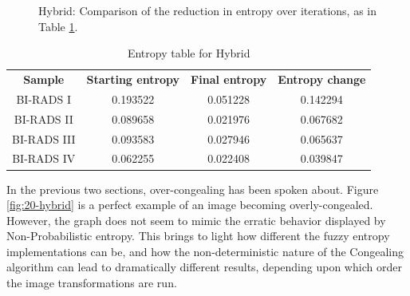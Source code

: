 \begin{figure}[H]
  \begin{center}
    \caption{Hybrid: Comparison of the reduction in entropy over iterations, as in Table \ref{table:hybrid-entropy}.}
  \end{center}
\end{figure}

\begin{table}[H]
  \centering
  \begin{tabular}{| c | c | c  | c |}
    \textbf{Sample} & \textbf{Starting entropy} & \textbf{Final entropy} & \textbf{Entropy change} \\
    BI-RADS I & 0.193522 & 0.051228 & 0.142294 \\
    BI-RADS II & 0.089658 & 0.021976  & 0.067682 \\
    BI-RADS III & 0.093583 & 0.027946 & 0.065637 \\
    BI-RADS IV & 0.062255 & 0.022408  & 0.039847 \\
  \end{tabular}
  \caption{Entropy table for Hybrid}
  \label{table:hybrid-entropy}
\end{table}

In the previous two sections, over-congealing has been spoken about. Figure \ref{fig:20-hybrid} is a perfect example of an image becoming overly-congealed. However, the graph does not seem to mimic the erratic behavior displayed by Non-Probabilistic entropy. This brings to light how different the fuzzy entropy implementations can be, and how the non-deterministic nature of the \Gls{Congealing} algorithm can lead to dramatically different results, depending upon which order the image transformations are run.

